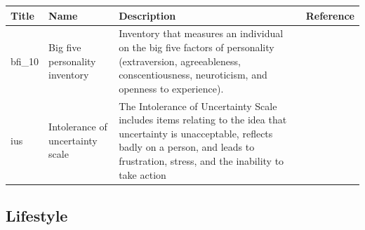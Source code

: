 \documentclass[]{book}
\begin{document}
\begin{longtable}[]{@{}llll@{}}
\toprule
\begin{minipage}[b]{0.22\columnwidth}\raggedright
Title\strut
\end{minipage} & \begin{minipage}[b]{0.27\columnwidth}\raggedright
Name\strut
\end{minipage} & \begin{minipage}[b]{0.22\columnwidth}\raggedright
Description\strut
\end{minipage} & \begin{minipage}[b]{0.18\columnwidth}\raggedright
Reference\strut
\end{minipage}\tabularnewline
\midrule
\endhead
\begin{minipage}[t]{0.22\columnwidth}\raggedright
bfi\_10\strut
\end{minipage} & \begin{minipage}[t]{0.27\columnwidth}\raggedright
Big five personality inventory\strut
\end{minipage} & \begin{minipage}[t]{0.22\columnwidth}\raggedright
Inventory that measures an individual on the big five factors of personality (extraversion, agreeableness, conscentiousness, neuroticism, and openness to experience).\strut
\end{minipage} & \begin{minipage}[t]{0.18\columnwidth}\raggedright
\strut
\end{minipage}\tabularnewline
\begin{minipage}[t]{0.22\columnwidth}\raggedright
ius\strut
\end{minipage} & \begin{minipage}[t]{0.27\columnwidth}\raggedright
Intolerance of uncertainty scale\strut
\end{minipage} & \begin{minipage}[t]{0.22\columnwidth}\raggedright
The Intolerance of Uncertainty Scale includes items relating to the idea that uncertainty is unacceptable, reflects badly on a person, and leads to frustration, stress, and the inability to take action\strut
\end{minipage} & \begin{minipage}[t]{0.18\columnwidth}\raggedright
\strut
\end{minipage}\tabularnewline
\bottomrule
\end{longtable}

\hypertarget{lifestyle-1}{%
\subsection{Lifestyle}\label{lifestyle-1}}
\end{document}
